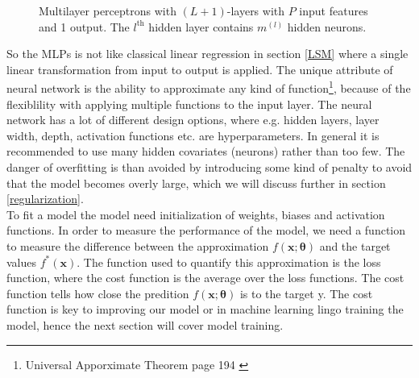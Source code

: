 \begin{figure}[th]
	\caption[Multilayer perceptrons with $(L+1)$-layers]{Multilayer perceptrons with $(L+1)$-layers with $P$ input features and 1 output. The $l^{\text{th}}$ hidden layer contains $m^{(l)}$ hidden neurons.}
	\label{fig:multilayer-perceptron}
\end{figure}

So the MLPs is not like classical linear regression in section \ref{LSM} where a single linear transformation from input to output is applied. The unique attribute of neural network is the ability to approximate any kind of function\footnote{Universal Apporximate Theorem page 194 \parencite{Goodfellow-et-al-2016}}, because of the flexiblility with applying multiple functions to the input layer. The neural network has a lot of different design options, where e.g. hidden layers, layer width, depth, activation functions etc. are hyperparameters. In general it is recommended to use many hidden covariates (neurons) rather than too few. The danger of overfitting is than avoided by introducing some kind of penalty to avoid that the model becomes overly large, which we will discuss further in section \ref{regularization}.\\

To fit a model the model need initialization of weights, biases and activation functions. In order to measure the performance of the model, we need a function to measure the difference between the approximation $f(\bm{x};\bm{\theta})$ and the target values $f^*(\bm{x})$. The function used to quantify this approximation is the loss function, where the cost function is the average over the loss functions. The cost function tells how close the predition $f(\bm{x};\bm{\theta})$ is to the target y. The cost function is key to improving our model or in machine learning lingo training the model, hence the next section will cover model training.

